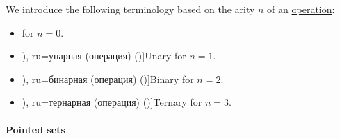 \begin{definition}\label{def:operation_arity}
  We introduce the following terminology based on the arity \( n \) of an \hyperref[def:operation_on_set]{operation}:
  \begin{itemize}
    \item {} for \( n = 0 \).
    \item \term[bg=унарна (операция) (\cite[75]{ГеновМиховскиМоллов1991}), ru=унарная (операция) (\cite[11]{Эдельман1975})]{Unary} for \( n = 1 \).
    \item \term[bg=бинарна (операция) (\cite[def. IV.1]{ГеновМиховскиМоллов1991}), ru=бинарная (операция) (\cite[11]{Эдельман1975})]{Binary} for \( n = 2 \).
    \item \term[bg=тернарна (операция) (\cite[75]{ГеновМиховскиМоллов1991}), ru=тернарная (операция) (\cite[11]{Эдельман1975})]{Ternary} for \( n = 3 \).
  \end{itemize}
\end{definition}

\paragraph{Pointed sets}

